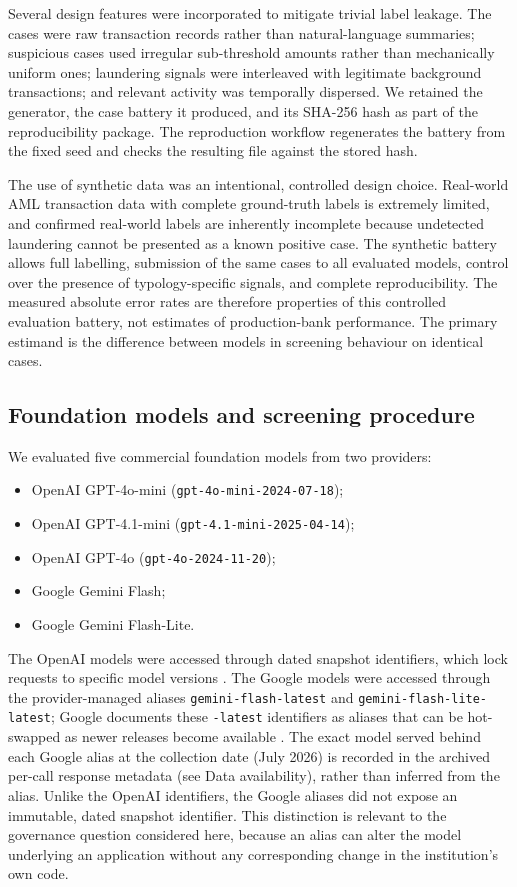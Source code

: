 \documentclass[pdflatex,sn-basic,Numbered]{sn-jnl}
\begin{document}
Several design features were incorporated to mitigate trivial label leakage. The cases were raw transaction records rather than natural-language summaries; suspicious cases used irregular sub-threshold amounts rather than mechanically uniform ones; laundering signals were interleaved with legitimate background transactions; and relevant activity was temporally dispersed. We retained the generator, the case battery it produced, and its SHA-256 hash as part of the reproducibility package. The reproduction workflow regenerates the battery from the fixed seed and checks the resulting file against the stored hash.

The use of synthetic data was an intentional, controlled design choice. Real-world AML transaction data with complete ground-truth labels is extremely limited, and confirmed real-world labels are inherently incomplete because undetected laundering cannot be presented as a known positive case. The synthetic battery allows full labelling, submission of the same cases to all evaluated models, control over the presence of typology-specific signals, and complete reproducibility. The measured absolute error rates are therefore properties of this controlled evaluation battery, not estimates of production-bank performance. The primary estimand is the difference between models in screening behaviour on identical cases.

\subsection{Foundation models and screening procedure}

We evaluated five commercial foundation models from two providers:

\begin{itemize}
\item OpenAI GPT-4o-mini (\texttt{gpt-4o-mini-2024-07-18});
\item OpenAI GPT-4.1-mini (\texttt{gpt-4.1-mini-2025-04-14});
\item OpenAI GPT-4o (\texttt{gpt-4o-2024-11-20});
\item Google Gemini Flash;
\item Google Gemini Flash-Lite.
\end{itemize}

The OpenAI models were accessed through dated snapshot identifiers, which lock requests to specific model versions \cite{openai-models}. The Google models were accessed through the provider-managed aliases \texttt{gemini-flash-latest} and \texttt{gemini-flash-lite-latest}; Google documents these \texttt{-latest} identifiers as aliases that can be hot-swapped as newer releases become available \cite{google-models}. The exact model served behind each Google alias at the collection date (July 2026) is recorded in the archived per-call response metadata (see Data availability), rather than inferred from the alias. Unlike the OpenAI identifiers, the Google aliases did not expose an immutable, dated snapshot identifier. This distinction is relevant to the governance question considered here, because an alias can alter the model underlying an application without any corresponding change in the institution's own code.
\end{document}
